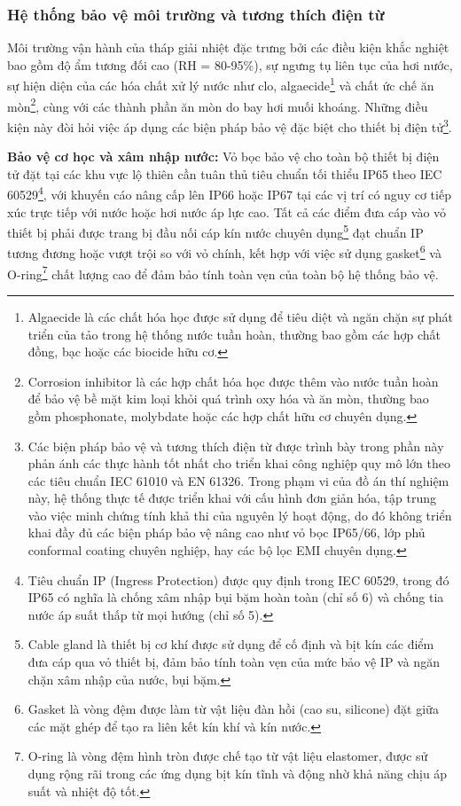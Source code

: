 \documentclass[../main.tex]{subfiles}
\begin{document}
\subsubsection{Hệ thống bảo vệ môi trường và tương thích điện từ}
Môi trường vận hành của tháp giải nhiệt đặc trưng bởi các điều kiện khắc nghiệt bao gồm độ ẩm tương đối cao (RH = 80-95\%), sự ngưng tụ liên tục của hơi nước, sự hiện diện của các hóa chất xử lý nước như clo, algaecide\footnote{Algaecide là các chất hóa học được sử dụng để tiêu diệt và ngăn chặn sự phát triển của tảo trong hệ thống nước tuần hoàn, thường bao gồm các hợp chất đồng, bạc hoặc các biocide hữu cơ.} và chất ức chế ăn mòn\footnote{Corrosion inhibitor là các hợp chất hóa học được thêm vào nước tuần hoàn để bảo vệ bề mặt kim loại khỏi quá trình oxy hóa và ăn mòn, thường bao gồm phosphonate, molybdate hoặc các hợp chất hữu cơ chuyên dụng.}, cùng với các thành phần ăn mòn do bay hơi muối khoáng. Những điều kiện này đòi hỏi việc áp dụng các biện pháp bảo vệ đặc biệt cho thiết bị điện tử\footnote{Các biện pháp bảo vệ và tương thích điện từ được trình bày trong phần này phản ánh các thực hành tốt nhất cho triển khai công nghiệp quy mô lớn theo các tiêu chuẩn IEC 61010 và EN 61326. Trong phạm vi của đồ án thí nghiệm này, hệ thống thực tế được triển khai với cấu hình đơn giản hóa, tập trung vào việc minh chứng tính khả thi của nguyên lý hoạt động, do đó không triển khai đầy đủ các biện pháp bảo vệ nâng cao như vỏ bọc IP65/66, lớp phủ conformal coating chuyên nghiệp, hay các bộ lọc EMI chuyên dụng.}.

\textbf{Bảo vệ cơ học và xâm nhập nước:} Vỏ bọc bảo vệ cho toàn bộ thiết bị điện tử đặt tại các khu vực lộ thiên cần tuân thủ tiêu chuẩn tối thiểu IP65 theo IEC 60529\footnote{Tiêu chuẩn IP (Ingress Protection) được quy định trong IEC 60529, trong đó IP65 có nghĩa là chống xâm nhập bụi bặm hoàn toàn (chỉ số 6) và chống tia nước áp suất thấp từ mọi hướng (chỉ số 5).}, với khuyến cáo nâng cấp lên IP66 hoặc IP67 tại các vị trí có nguy cơ tiếp xúc trực tiếp với nước hoặc hơi nước áp lực cao. Tất cả các điểm đưa cáp vào vỏ thiết bị phải được trang bị đầu nối cáp kín nước chuyên dụng\footnote{Cable gland là thiết bị cơ khí được sử dụng để cố định và bịt kín các điểm đưa cáp qua vỏ thiết bị, đảm bảo tính toàn vẹn của mức bảo vệ IP và ngăn chặn xâm nhập của nước, bụi bặm.} đạt chuẩn IP tương đương hoặc vượt trội so với vỏ chính, kết hợp với việc sử dụng gasket\footnote{Gasket là vòng đệm được làm từ vật liệu đàn hồi (cao su, silicone) đặt giữa các mặt ghép để tạo ra liên kết kín khí và kín nước.} và O-ring\footnote{O-ring là vòng đệm hình tròn được chế tạo từ vật liệu elastomer, được sử dụng rộng rãi trong các ứng dụng bịt kín tĩnh và động nhờ khả năng chịu áp suất và nhiệt độ tốt.} chất lượng cao để đảm bảo tính toàn vẹn của toàn bộ hệ thống bảo vệ.
\end{document}
